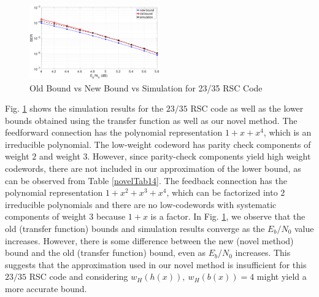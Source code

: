 \begin{figure}[htbp]
\centering
		\includegraphics[width=0.5\textwidth]{./Images/RSC_23_35_lower_weights.eps}
		\caption{Old Bound vs New Bound vs Simulation for 23/35 RSC Code}
		\label{simFig3}
		\end{figure}
Fig. \ref{simFig3} shows the simulation results for the $23/35$ RSC code as well as the lower bounds obtained using the transfer function as well as our novel method. The feedforward connection has the polynomial representation $1+x+x^4$, which is an irreducible polynomial. The low-weight codeword has parity check components of weight $2$ and weight $3$. However, since parity-check components yield high weight codewords, there are not included in our approximation of the lower bound, as can be observed from Table \ref{novelTab14}. The feedback connection has the polynomial representation $1+x^2+x^3+x^4$, which can be factorized into $2$ irreducible polynomials and there are no low-codewords with systematic components of weight $3$ because $1+x$ is a factor. In Fig. \ref{simFig3}, we observe that the old (transfer function) bounds and simulation results converge as the $E_b/N_0$ value increases. However, there is some difference between the new (novel method) bound and the old (transfer function) bound, even as $E_b/N_0$ increases. This suggests that the approximation used in our novel method is insufficient for this $23/35$ RSC code and considering  $w_H(h(x)),~w_H(b(x))=4$ might yield a more accurate bound.


		
		


